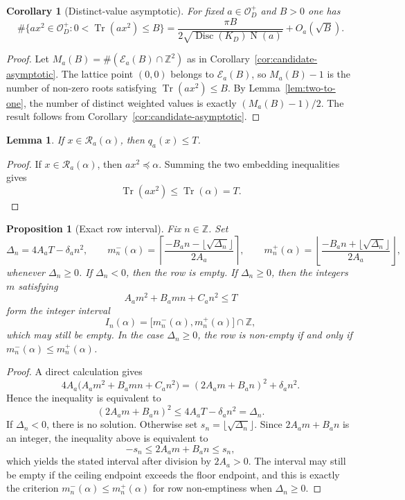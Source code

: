 \documentclass[manuscript]{acmart}
\theoremstyle{plain}
\newtheorem{lemma}[theorem]{Lemma}
\newtheorem{proposition}[theorem]{Proposition}
\newtheorem{corollary}[theorem]{Corollary}
\theoremstyle{definition}
\theoremstyle{nonitalicremark}
\newcommand{\Z}{\mathbb{Z}}
\newcommand{\OO}{\mathcal{O}}
\newcommand{\OD}{\OO_D}
\newcommand{\Tr}{\operatorname{Tr}}
\newcommand{\N}{\operatorname{N}}
\newcommand{\Disc}{\operatorname{Disc}}
\newcommand{\cE}{\mathcal{E}}
\newcommand{\cR}{\mathcal{R}}
\begin{document}
\begin{corollary}[Distinct-value asymptotic]\label{cor:distinct-asymptotic}
For fixed $a\in\OD^+$ and $B>0$ one has
\[
\#\{a x^2\in\OD^+ : 0<\Tr(a x^2)\le B\}
=
\frac{\pi B}{2\sqrt{\Disc(K_D)\N(a)}} + O_a(\sqrt B).
\]
\end{corollary}

\begin{proof}
Let $M_a(B)=\#(\cE_a(B)\cap\Z^2)$ as in Corollary~\ref{cor:candidate-asymptotic}. The lattice point
$(0,0)$ belongs to $\cE_a(B)$, so $M_a(B)-1$ is the number of non-zero roots satisfying
$\Tr(a x^2)\le B$. By Lemma~\ref{lem:two-to-one}, the number of distinct weighted values is exactly
$(M_a(B)-1)/2$. The result follows from Corollary~\ref{cor:candidate-asymptotic}.
\end{proof}

\begin{lemma}\label{lem:trace-necessary}
If $x\in\cR_a(\alpha)$, then $q_a(x)\le T$.
\end{lemma}

\begin{proof}
If $x\in\cR_a(\alpha)$, then $a x^2\preccurlyeq \alpha$. Summing the two embedding inequalities gives
\[
\Tr(a x^2)\le \Tr(\alpha)=T.
\]
\end{proof}

\begin{proposition}[Exact row interval]\label{prop:row-interval}
Fix $n\in\Z$. Set
\[
\Delta_n = 4A_a T - \delta_a n^2,
\qquad
m_n^-(\alpha)=\left\lceil \frac{-B_a n - \lfloor\sqrt{\Delta_n}\rfloor}{2A_a} \right\rceil,
\qquad
m_n^+(\alpha)=\left\lfloor \frac{-B_a n + \lfloor\sqrt{\Delta_n}\rfloor}{2A_a} \right\rfloor,
\]
whenever $\Delta_n\ge 0$. If $\Delta_n<0$, then the row is empty. If $\Delta_n\ge 0$, then the integers
$m$ satisfying
\[
A_a m^2+B_a m n + C_a n^2 \le T
\]
form the integer interval
\[
I_n(\alpha)=\bigl[m_n^-(\alpha), m_n^+(\alpha)\bigr]\cap\Z,
\]
which may still be empty. In the case $\Delta_n\ge 0$, the row is non-empty if and only if
$m_n^-(\alpha)\le m_n^+(\alpha)$.
\end{proposition}

\begin{proof}
A direct calculation gives
\[
4A_a\bigl(A_a m^2+B_a m n + C_a n^2\bigr) = (2A_a m + B_a n)^2 + \delta_a n^2.
\]
Hence the inequality is equivalent to
\[
(2A_a m + B_a n)^2 \le 4A_a T - \delta_a n^2 = \Delta_n.
\]
If $\Delta_n<0$, there is no solution. Otherwise set $s_n=\lfloor\sqrt{\Delta_n}\rfloor$. Since
$2A_a m + B_a n$ is an integer, the inequality above is equivalent to
\[
-s_n \le 2A_a m + B_a n \le s_n,
\]
which yields the stated interval after division by $2A_a>0$. The interval may still be empty if the
ceiling endpoint exceeds the floor endpoint, and this is exactly the criterion
$m_n^-(\alpha)\le m_n^+(\alpha)$ for row non-emptiness when $\Delta_n\ge 0$.
\end{proof}
\end{document}
